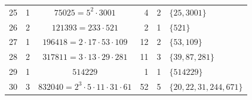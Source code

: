 \begin{table}[ht]
\begin{tabular}{rrcrrl}
  25 & 1 & $75025 = 5^{2} \cdot 3001$ & 4 & 2 & $\{25,3001\}$ \\
  26 & 2 & $121393 = 233 \cdot 521$ & 2 & 1 & $\{521\}$ \\
  27 & 1 & $196418 = 2 \cdot 17 \cdot 53 \cdot 109$ & 12 & 2 & $\{53,109\}$ \\
  28 & 2 & $317811 = 3 \cdot 13 \cdot 29 \cdot 281$ & 11 & 3 & $\{39,87,281\}$ \\
  29 & 1 & $514229$ & 1 & 1 & $\{514229\}$ \\
  30 & 3 & $832040 = 2^{3} \cdot 5 \cdot 11 \cdot 31 \cdot 61$ & 52 & 5 & $\{20,22,31,244,671\}$ \\
\bottomrule
\end{tabular}
\end{table}